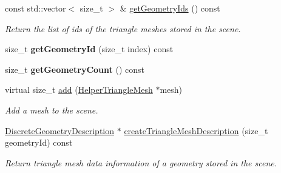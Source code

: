 \begin{DoxyCompactItemize}
\item 
\mbox{\label{classvisilib_1_1_helper_triangle_mesh_container_a63ca99e5f2dcb90f0066ffe38e071879}} 
const std\+::vector$<$ size\+\_\+t $>$ \& \mbox{\hyperlink{classvisilib_1_1_helper_triangle_mesh_container_a63ca99e5f2dcb90f0066ffe38e071879}{get\+Geometry\+Ids}} () const
\begin{DoxyCompactList}\small\item\em Return the list of ids of the triangle meshes stored in the scene. \end{DoxyCompactList}\item 
\mbox{\label{classvisilib_1_1_helper_triangle_mesh_container_accd8d513939ca4f856b6292fbd94344e}} 
size\+\_\+t {\bfseries get\+Geometry\+Id} (size\+\_\+t index) const
\item 
\mbox{\label{classvisilib_1_1_helper_triangle_mesh_container_a08d242a0481429d98a0a23aac8305ea8}} 
size\+\_\+t {\bfseries get\+Geometry\+Count} () const
\item 
\mbox{\label{classvisilib_1_1_helper_triangle_mesh_container_ab29cb0e681a4cc58ad6a31c08ba371e5}} 
virtual size\+\_\+t \mbox{\hyperlink{classvisilib_1_1_helper_triangle_mesh_container_ab29cb0e681a4cc58ad6a31c08ba371e5}{add}} (\mbox{\hyperlink{classvisilib_1_1_helper_triangle_mesh}{Helper\+Triangle\+Mesh}} $\ast$mesh)
\begin{DoxyCompactList}\small\item\em Add a mesh to the scene. \end{DoxyCompactList}\item 
\mbox{\label{classvisilib_1_1_helper_triangle_mesh_container_ab9b46c3ef0ab846392fb53c5641add36}} 
\mbox{\hyperlink{structvisilib_1_1_discrete_geometry_description}{Discrete\+Geometry\+Description}} $\ast$ \mbox{\hyperlink{classvisilib_1_1_helper_triangle_mesh_container_ab9b46c3ef0ab846392fb53c5641add36}{create\+Triangle\+Mesh\+Description}} (size\+\_\+t geometry\+Id) const
\begin{DoxyCompactList}\small\item\em Return triangle mesh data information of a geometry stored in the scene. \end{DoxyCompactList}\item 

\end{DoxyCompactItemize}
